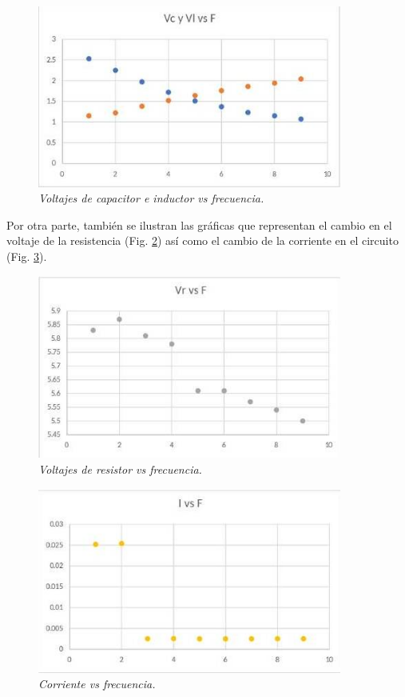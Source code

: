 \documentclass[spanish,notitlepage,letterpaper, 12pt]{article}
\begin{document}
\begin{figure}[ht]
    \centering
    \includegraphics[width=10cm]{images/capacitor-vs-inductor-voltages.jpg}
    \caption{\textit{Voltajes de capacitor e inductor vs frecuencia.}}
    \label{fig:voltages-vs-freq}
\end{figure}
Por otra parte, también se ilustran las gráficas que representan el cambio en el voltaje de la resistencia (Fig. \ref{fig:voltage-r-vs-freq}) así como el cambio de la corriente en el circuito (Fig. \ref{fig:current-vs-freq}).\par
\newpage
\begin{figure}[ht]
    \centering
    \includegraphics[width=10cm]{images/resistor-voltage.jpg}
    \caption{\textit{Voltajes de resistor vs frecuencia.}}
    \label{fig:voltage-r-vs-freq}
\end{figure}
\begin{figure}[ht]
    \centering
    \includegraphics[width=10cm]{images/current.jpg}
    \caption{\textit{Corriente vs frecuencia.}}
    \label{fig:current-vs-freq}
\end{figure}
\end{document}

